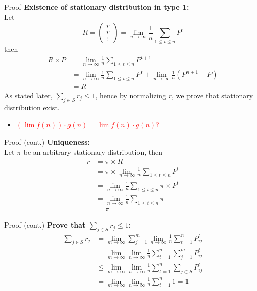 \documentclass[mathserif]{beamer}
\begin{document}
\begin{frame}[shrink]{Proof}
	\textbf{Existence of stationary distribution in type 1:} \\
	Let 
	\[
	R = 
	\begin{pmatrix}
		r \\
		r \\
		\vdots
	\end{pmatrix} 
	= \lim_{n\to\infty} \frac{1}{n} \sum_{1 \leq t \leq n} P^t
	\]
	then
	\begin{align*}
		R \times P &= \lim_{n\to\infty} \frac{1}{n} \sum_{1 \leq t \leq n} P^{t+1} \\
		&= \lim_{n\to\infty} \frac{1}{n} \sum_{1 \leq t \leq n} P^t + \lim_{n\to\infty} \frac{1}{n}(P^{n+1} - P) \\
		&= R
	\end{align*}
	As stated later, $\sum_{j \in S} r_j \leq 1$, hence by normalizing $r$, we prove that stationary distribution exist.
	\begin{itemize}
	\item \textcolor{red}{$(\lim f(n))\cdot g(n) = \lim f(n) \cdot g(n)$?}
	\end{itemize}
\end{frame}

\begin{frame}{Proof (cont.)}
	\textbf{Uniqueness:} \\
	Let $\pi$ be an arbitrary stationary distribution, then
	\begin{align*}
	r &= \pi \times R \\
	&= \pi \times \lim_{n\to\infty} \frac{1}{n} \sum_{1 \leq t \leq n} P^t \\
	&= \lim_{n\to\infty} \frac{1}{n} \sum_{1 \leq t \leq n} \pi \times P^t \\
	&= \lim_{n\to\infty} \frac{1}{n} \sum_{1 \leq t \leq n} \pi \\
	&= \pi
	\end{align*}
\end{frame}

\begin{frame}{Proof (cont.)}\label{proportion_sum}
	\textbf{Prove that $\sum_{j \in S} r_j \leq 1$:}\\
	\begin{align*}
	\sum_{j \in S} r_j & = 
	\lim_{m\to\infty} \sum_{j=1}^m \lim_{n\to\infty} \frac{1}{n} \sum_{t=1}^n P^t_{ij} \\
	& = \lim_{m\to\infty} \lim_{n\to\infty} \frac{1}{n}\sum_{t=1}^n \sum_{j=1}^m P^t_{ij} \\
	& \leq \lim_{m\to\infty} \lim_{n\to\infty} \frac{1}{n}\sum_{t=1}^n \sum_{j\in S} P^t_{ij} \\
	& = \lim_{m\to\infty} \lim_{n\to\infty} \frac{1}{n}\sum_{t=1}^n 1 = 1
	\end{align*}
\end{frame}
\end{document}
